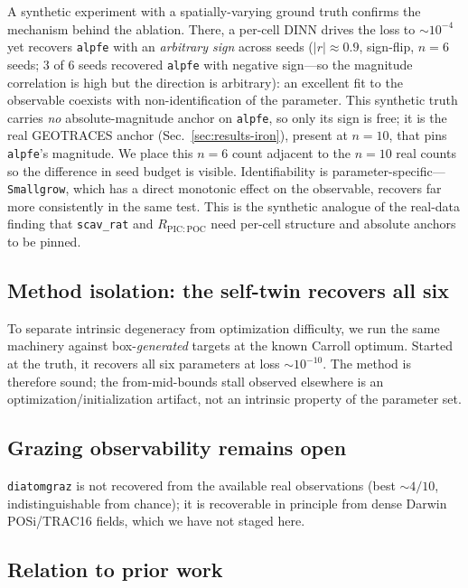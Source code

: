 \documentclass[11pt]{article}
\begin{document}
A synthetic experiment with a spatially-varying ground truth confirms the
mechanism behind the ablation. There, a per-cell DINN drives the loss to
${\sim}10^{-4}$ yet recovers \texttt{alpfe} with an \emph{arbitrary sign} across
seeds ($|r|\approx0.9$, sign-flip, $n=6$ seeds; $3$ of $6$ seeds recovered
\texttt{alpfe} with negative sign---so the magnitude correlation is high but the
direction is arbitrary): an excellent fit to the observable
coexists with non-identification of the parameter. This synthetic truth carries
\emph{no} absolute-magnitude anchor on \texttt{alpfe}, so only its sign is free;
it is the real GEOTRACES anchor (Sec.~\ref{sec:results-iron}), present at $n=10$,
that pins \texttt{alpfe}'s magnitude. We place this $n=6$ count adjacent to the
$n=10$ real counts so the difference in seed budget is visible. Identifiability is
parameter-specific---\texttt{Smallgrow}, which has a direct monotonic effect on
the observable, recovers far more consistently in the same test. This is the
synthetic analogue of the real-data finding that \texttt{scav\_rat} and
$R_{\mathrm{PIC:POC}}$ need per-cell structure and absolute anchors to be pinned.

\subsection{Method isolation: the self-twin recovers all six}
\label{sec:results-selftwin}

To separate intrinsic degeneracy from optimization difficulty, we run the same
machinery against box-\emph{generated} targets at the known Carroll optimum.
Started at the truth, it recovers all six parameters at loss ${\sim}10^{-10}$.
The method is therefore sound; the from-mid-bounds stall observed elsewhere is an
optimization/initialization artifact, not an intrinsic property of the parameter
set.

\subsection{Grazing observability remains open}
\label{sec:results-diatomgraz}

\texttt{diatomgraz} is not recovered from the available real observations (best
${\sim}4/10$, indistinguishable from chance); it is recoverable in principle from
dense Darwin POSi/TRAC16 fields, which we have not staged here.

\subsection{Relation to prior work}
\label{sec:results-related}
\end{document}

